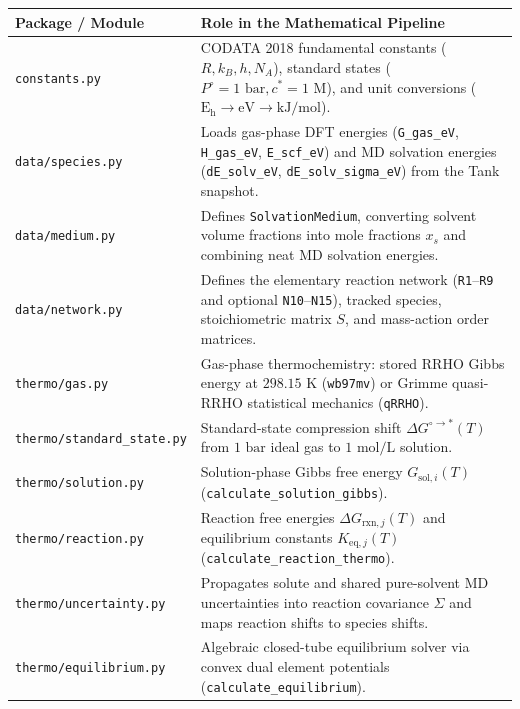 \documentclass[11pt,a4paper]{article}
\begin{document}
\begin{tabularx}{\textwidth}{L{4.9cm} Y}
\toprule
\textbf{Package / Module} & \textbf{Role in the Mathematical Pipeline} \\
\midrule
\texttt{constants.py} & CODATA 2018 fundamental constants ($R, k_B, h, N_A$), standard states ($P^\circ = 1\text{ bar}, c^* = 1\text{ M}$), and unit conversions ($\text{E}_{\text{h}} \to \text{eV} \to \text{kJ/mol}$). \\[3pt]
\texttt{data/\allowbreak{}species.py} & Loads gas-phase DFT energies (\texttt{G\_\allowbreak{}gas\_\allowbreak{}eV}, \texttt{H\_\allowbreak{}gas\_\allowbreak{}eV}, \texttt{E\_\allowbreak{}scf\_\allowbreak{}eV}) and MD solvation energies (\texttt{dE\_\allowbreak{}solv\_\allowbreak{}eV}, \texttt{dE\_\allowbreak{}solv\_\allowbreak{}sigma\_\allowbreak{}eV}) from the Tank snapshot. \\[3pt]
\texttt{data/\allowbreak{}medium.py} & Defines \texttt{SolvationMedium}, converting solvent volume fractions into mole fractions $x_s$ and combining neat MD solvation energies. \\[3pt]
\texttt{data/\allowbreak{}network.py} & Defines the elementary reaction network (\texttt{R1}--\texttt{R9} and optional \texttt{N10}--\texttt{N15}), tracked species, stoichiometric matrix $S$, and mass-action order matrices. \\[3pt]
\texttt{thermo/\allowbreak{}gas.py} & Gas-phase thermochemistry: stored RRHO Gibbs energy at $298.15\text{ K}$ (\texttt{wb97mv}) or Grimme quasi-RRHO statistical mechanics (\texttt{qRRHO}). \\[3pt]
\texttt{thermo/\allowbreak{}standard\_\allowbreak{}state.py} & Standard-state compression shift $\Delta G^{\circ \to *}(T)$ from $1\text{ bar}$ ideal gas to $1\text{ mol/L}$ solution. \\[3pt]
\texttt{thermo/\allowbreak{}solution.py} & Solution-phase Gibbs free energy $G_{\text{sol}, i}(T)$ (\texttt{calculate\_\allowbreak{}solution\_\allowbreak{}gibbs}). \\[3pt]
\texttt{thermo/\allowbreak{}reaction.py} & Reaction free energies $\Delta G_{\text{rxn}, j}(T)$ and equilibrium constants $K_{\text{eq}, j}(T)$ (\texttt{calculate\_\allowbreak{}reaction\_\allowbreak{}thermo}). \\[3pt]
\texttt{thermo/\allowbreak{}uncertainty.py} & Propagates solute and shared pure-solvent MD uncertainties into reaction covariance $\Sigma$ and maps reaction shifts to species shifts. \\[3pt]
\texttt{thermo/\allowbreak{}equilibrium.py} & Algebraic closed-tube equilibrium solver via convex dual element potentials (\texttt{calculate\_\allowbreak{}equilibrium}). \\[3pt]

\end{tabularx}
\end{document}
